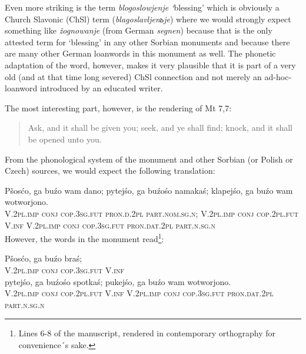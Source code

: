 \documentclass[output=paper,hidelinks]{langscibook}
\begin{document}
Even more striking is the term \textit{blogoslowjenje ‘}blessing’ which is obviously a Church Slavonic (ChSl) term (\textit{blagoslavljen{ь}je}) where we would strongly expect something like \textit{žognowanje} (from German \textit{segnen}) because that is the only attested term for ‘blessing’ in any other Sorbian monuments and because there are many other German loanwords in this monument as well. The phonetic adaptation of the word, however, makes it very plausible that it is part of a very old (and at that time long severed) ChSl connection and not merely an ad-hoc-loanword introduced by an educated writer.
 

 
The most interesting part, however, is the rendering of Mt 7,7:
 

\begin{quote}
Ask, and it shall be given you; seek, and ye shall find; knock, and it shall be opened unto you.
\end{quote}

 
From the phonological system of the monument and other Sorbian (or Polish or Czech) sources, we would expect the following translation:
 

\ea
\gll Pšosćo, ga buźo wam dano; pytejśo, ga buźośo namakaś; klapejśo, ga buźo wam wotworjono.\\
V.2\textsc{pl}.\textsc{imp} \textsc{conj} \textsc{cop}.\textsc{3sg}.\textsc{fut} \textsc{pron}.\textsc{d}.2\textsc{pl} \textsc{\textsc{part}}.\textsc{nom}.\textsc{sg}.\textsc{n}; V.2\textsc{pl}.\textsc{imp} \textsc{conj} \textsc{cop}.2\textsc{pl}.\textsc{fut} V.\textsc{inf} V.2\textsc{pl}.\textsc{imp} \textsc{conj} \textsc{cop}.\textsc{3sg}.\textsc{fut} \textsc{pron}.\textsc{dat}.2\textsc{pl} \textsc{part}.\textsc{n}.\textsc{sg}.\textsc{n}\\
\glt{}
\z
However, the words in the monument read\footnote{Lines 6-8 of the manuscript, rendered in contemporary orthography for convenience´s sake.}:

\ea 
\gll Pšosćo, ga buźo braś;\\ 
V.2\textsc{pl}.\textsc{imp} \textsc{conj} \textsc{cop}.\textsc{3sg}.\textsc{fut} V.\textsc{inf} \\

\gll pytejśo, ga buźośo spotkaś; pukejśo, ga buźo wam wotworjono.\\
V.2\textsc{pl}.\textsc{imp} \textsc{conj} \textsc{cop}.2\textsc{pl}.\textsc{fut} V.\textsc{inf} V.2\textsc{pl}.\textsc{imp} \textsc{conj} \textsc{cop}.\textsc{3sg}.\textsc{fut} \textsc{pron}.\textsc{dat}.2\textsc{pl} \textsc{part}.\textsc{n}.\textsc{sg}.\textsc{n}\\
\glt{}
\z
\end{document}
